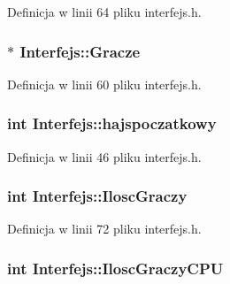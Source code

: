 Definicja w linii 64 pliku interfejs.\-h.

\hypertarget{class_interfejs_ab7dda8ddff87d9cb57f210f427871de8}{
\subsubsection[{Gracze}]{$\ast$ Interfejs\-::\-Gracze}}\label{class_interfejs_ab7dda8ddff87d9cb57f210f427871de8}


Definicja w linii 60 pliku interfejs.\-h.

\hypertarget{class_interfejs_a79c7d1ef2820f5d5104ab91b691d6189}{
\subsubsection[{hajspoczatkowy}]{\setlength{\rightskip}{0pt plus 5cm}int Interfejs\-::hajspoczatkowy\hspace{0.3cm}{\ttfamily [private]}}}\label{class_interfejs_a79c7d1ef2820f5d5104ab91b691d6189}


Definicja w linii 46 pliku interfejs.\-h.

\hypertarget{class_interfejs_a4978f16cdd27e1f44580d29a3b80e1f5}{
\subsubsection[{Ilosc\-Graczy}]{\setlength{\rightskip}{0pt plus 5cm}int Interfejs\-::\-Ilosc\-Graczy}}\label{class_interfejs_a4978f16cdd27e1f44580d29a3b80e1f5}


Definicja w linii 72 pliku interfejs.\-h.

\hypertarget{class_interfejs_ab2e839ed9e43affb8701d89338564e2c}{
\subsubsection[{Ilosc\-Graczy\-C\-P\-U}]{\setlength{\rightskip}{0pt plus 5cm}int Interfejs\-::\-Ilosc\-Graczy\-C\-P\-U}}\label{class_interfejs_ab2e839ed9e43affb8701d89338564e2c}


